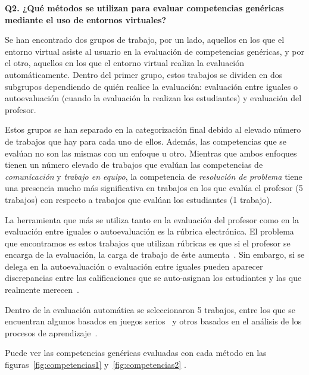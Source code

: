 \bigskip
\textbf{Q2. ¿Qué métodos se utilizan para evaluar competencias genéricas mediante el uso de entornos virtuales?}

Se han encontrado dos grupos de trabajo, por un lado, aquellos en los que el entorno virtual asiste al usuario en la evaluación de competencias genéricas, y por el otro, aquellos en los que el entorno virtual realiza la evaluación automáticamente. Dentro del primer grupo, estos trabajos se dividen en dos subgrupos dependiendo de quién realice la evaluación: evaluación entre iguales o autoevaluación (cuando la evaluación la realizan los estudiantes) y evaluación del profesor.

Estos grupos se han separado en la categorización final debido al elevado número de trabajos que hay para cada uno de ellos. Además, las competencias que se evalúan no son las mismas con un enfoque u otro. Mientras que ambos enfoques tienen un número elevado de trabajos que evalúan las competencias de \emph{comunicación} y \emph{trabajo en equipo}, la competencia de \emph{resolución de problema} tiene una presencia mucho más significativa en trabajos en los que evalúa el profesor (5 trabajos) con respecto a trabajos que evalúan los estudiantes (1 trabajo).

La herramienta que más se utiliza tanto en la evaluación del profesor como en la evaluación entre iguales o autoevaluación es la rúbrica electrónica. El problema que encontramos es estos trabajos que utilizan rúbricas es que si el profesor se encarga de la evaluación, la carga de trabajo de éste aumenta~\cite{lacuesta2009active}. Sin embargo, si se delega en la autoevaluación o evaluación entre iguales pueden aparecer discrepancias entre las calificaciones que se auto-asignan los estudiantes y las que realmente merecen~\cite{carreras2013promotion}. 

Dentro de la evaluación automática se seleccionaron 5 trabajos, entre los que se encuentran algunos basados en juegos serios~\cite{djaouti2011classifying,bedek2011behavioral} y otros basados en el análisis de los procesos de aprendizaje~\cite{rayon2014web,fidalgo:2015}.

Puede ver las competencias genéricas evaluadas con cada método en las figuras~\ref{fig:competencias1} y~\ref{fig:competencias2} .

